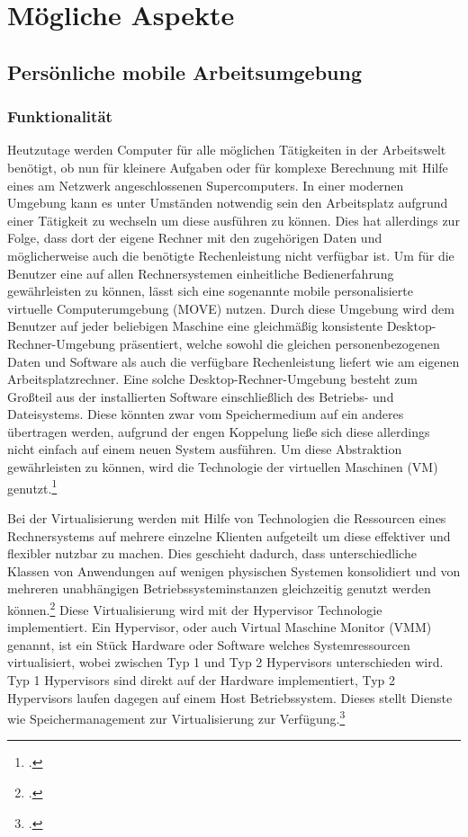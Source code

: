\newpage
\section{Mögliche Aspekte}
\subsection{Persönliche mobile Arbeitsumgebung}
\subsubsection{Funktionalität}
Heutzutage werden Computer für alle möglichen Tätigkeiten in der Arbeitswelt benötigt, ob nun für kleinere Aufgaben oder für komplexe Berechnung mit Hilfe eines am Netzwerk angeschlossenen Supercomputers. In einer modernen Umgebung kann es unter Umständen notwendig sein den Arbeitsplatz aufgrund einer Tätigkeit zu wechseln um diese ausführen zu können. Dies hat allerdings zur Folge, dass dort der eigene Rechner mit den zugehörigen Daten und möglicherweise auch die benötigte Rechenleistung nicht verfügbar ist.
Um für die Benutzer eine auf allen Rechnersystemen einheitliche Bedienerfahrung gewährleisten zu können, lässt sich eine sogenannte mobile personalisierte virtuelle Computerumgebung (MOVE) nutzen. Durch diese Umgebung wird dem Benutzer auf jeder beliebigen Maschine eine gleichmäßig konsistente Desktop-Rechner-Umgebung präsentiert, welche sowohl die gleichen personenbezogenen Daten und Software als auch die verfügbare Rechenleistung liefert wie am eigenen Arbeitsplatzrechner. Eine solche Desktop-Rechner-Umgebung besteht zum Großteil aus der installierten Software einschließlich des Betriebs- und Dateisystems. Diese könnten zwar vom Speichermedium auf ein anderes übertragen werden, aufgrund der engen Koppelung ließe sich diese allerdings nicht einfach auf einem neuen System ausführen. Um diese Abstraktion gewährleisten zu können, wird die Technologie der virtuellen Maschinen (VM) genutzt.\footcite[Vgl.][Seite 890 f.]{MOVE}

Bei der Virtualisierung werden mit Hilfe von Technologien die Ressourcen eines Rechnersystems auf mehrere einzelne Klienten aufgeteilt um diese effektiver und flexibler nutzbar zu machen. Dies geschieht dadurch, dass unterschiedliche Klassen von Anwendungen auf wenigen physischen Systemen konsolidiert und von mehreren unabhängigen Betriebssysteminstanzen gleichzeitig genutzt werden können.\footcite[Vgl.][Seite 197]{InformatikSpektrum} Diese Virtualisierung wird mit der Hypervisor Technologie implementiert. Ein Hypervisor, oder auch Virtual Maschine Monitor (VMM) genannt, ist ein Stück Hardware oder Software welches Systemressourcen virtualisiert, wobei zwischen Typ 1 und Typ 2 Hypervisors unterschieden wird. Typ 1 Hypervisors sind direkt auf der Hardware implementiert, Typ 2 Hypervisors laufen dagegen auf einem Host Betriebssystem. Dieses stellt Dienste wie Speichermanagement zur Virtualisierung zur Verfügung.\footcite[Vgl.][]{ibm}

